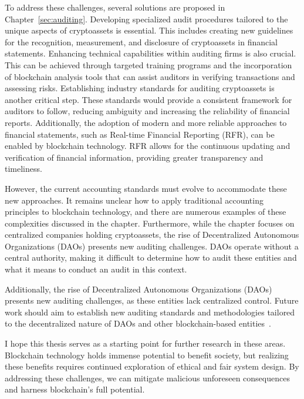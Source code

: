 To address these challenges, several solutions are proposed in Chapter~\ref{sec:auditing}. Developing specialized audit procedures tailored to the unique aspects of cryptoassets is essential. This includes creating new guidelines for the recognition, measurement, and disclosure of cryptoassets in financial statements. Enhancing technical capabilities within auditing firms is also crucial. This can be achieved through targeted training programs and the incorporation of blockchain analysis tools that can assist auditors in verifying transactions and assessing risks. Establishing industry standards for auditing cryptoassets is another critical step. These standards would provide a consistent framework for auditors to follow, reducing ambiguity and increasing the reliability of financial reports. Additionally, the adoption of modern and more reliable approaches to financial statements, such as Real-time Financial Reporting (RFR), can be enabled by blockchain technology. RFR allows for the continuous updating and verification of financial information, providing greater transparency and timeliness.

However, the current accounting standards must evolve to accommodate these new approaches. It remains unclear how to apply traditional accounting principles to blockchain technology, and there are numerous examples of these complexities discussed in the chapter. Furthermore, while the chapter focuses on centralized companies holding cryptoassets, the rise of Decentralized Autonomous Organizations (DAOs) presents new auditing challenges. DAOs operate without a central authority, making it difficult to determine how to audit these entities and what it means to conduct an audit in this context.

Additionally, the rise of Decentralized Autonomous Organizations (DAOs) presents new auditing challenges, as these entities lack centralized control. Future work should aim to establish new auditing standards and methodologies tailored to the decentralized nature of DAOs and other blockchain-based entities~\cite{tan2023open}.


\vspace{10mm}

I hope this thesis serves as a starting point for further research in these areas. Blockchain technology holds immense potential to benefit society, but realizing these benefits requires continued exploration of ethical and fair system design. By addressing these challenges, we can mitigate malicious unforeseen consequences and harness blockchain's full potential.

